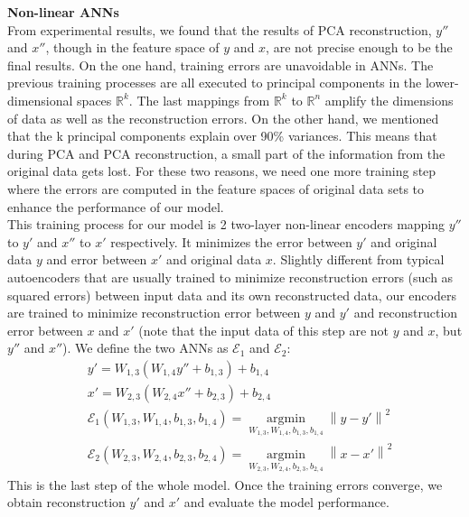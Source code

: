 \documentclass[12pt]{report} %
\newcommand{\norm}[1]{\left\lVert #1 \right\rVert}
\begin{document}
\textbf{Non-linear ANNs}\\
From experimental results, we found that the results of PCA reconstruction, $y''$ and $x''$, though in the feature space of $y$ and $x$, are not precise enough to be the final results. On the one hand, training errors are unavoidable in ANNs. The previous training processes are all executed to principal components in the lower-dimensional spaces $\mathbb{R}^{k}$. The last mappings from $\mathbb{R}^{k}$ to $\mathbb{R}^{n}$ amplify the dimensions of data as well as the reconstruction errors. On the other hand, we mentioned that the k principal components explain over 90\% variances. This means that during PCA and PCA reconstruction, a small part of the information from the original data gets lost. For these two reasons, we need one more training step where the errors are computed in the feature spaces of original data sets to enhance the performance of our model. \\
This training process for our model is 2 two-layer non-linear encoders mapping $y''$ to $y'$ and $x''$ to $x'$ respectively. It minimizes the error between $y'$ and original data $y$ and error between $x'$ and original data $x$. Slightly different from typical autoencoders that are usually trained to minimize reconstruction errors (such as squared errors) between input data and its own reconstructed data, our encoders are trained to minimize reconstruction error between $y$ and $y'$ and reconstruction error between $x$ and $x'$ (note that the input data of this step are not $y$ and $x$, but $y''$ and $x''$). We define the two ANNs as $\mathcal{E}_1$ and $\mathcal{E}_2$:
\begin{equation}
\begin{split}
&y'=W_{1,3}(W_{1,4}y''+b_{1,3})+b_{1,4} \\
&x'=W_{2,3}(W_{2,4}x''+b_{2,3})+b_{2,4} \\
&\mathcal{E}_1(W_{1,3},W_{1,4},b_{1,3},b_{1,4})=\operatorname*{argmin}_{W_{1,3},W_{1,4},b_{1,3},b_{1,4}}\norm{y-y'}^2 \\
&\mathcal{E}_2(W_{2,3},W_{2,4},b_{2,3},b_{2,4})=\operatorname*{argmin}_{W_{2,3},W_{2,4},b_{2,3},b_{2,4}}\norm{x-x'}^2
\end{split}
\end{equation}
This is the last step of the whole model. Once the training errors converge, we obtain reconstruction $y'$ and $x'$ and evaluate the model performance.
\end{document}
